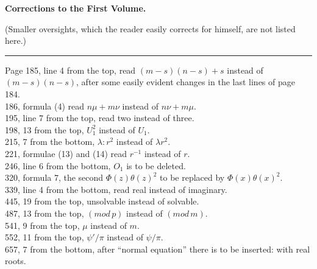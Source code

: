 
\begin{center}
\textbf{Corrections to the First Volume.}
\end{center}

\noindent (Smaller oversights, which the reader easily corrects for himself, are not listed here.)

\begin{center}
\rule{3cm}{0.4pt}
\end{center}

\bigskip
\noindent Page 185, line 4 from the top, read $(m-s)(n-s)+s$ instead of $(m-s)(n-s)$, after
some easily evident changes in the last lines of
page 184.\\
\glqq{} 186, formula (4) read $n\mu + m\nu$ instead of $n\nu + m\mu$.\\
\glqq{} 195, line 7 from the top, read two instead of three.\\
\glqq{} 198, \glqq{} 13 from the top, \glqq{} $U_1^2$ instead of $U_1$.\\
\glqq{} 215, \glqq{} 7 from the bottom, \glqq{} $\lambda : r^2$ instead of $\lambda r^2$.\\
\glqq{} 221, formulae (13) and (14) read $r^{-1}$ instead of $r$.\\
\glqq{} 246, line 6 from the bottom, $O_1$ is to be deleted.\\
\glqq{} 320, formula 7, the second $\Phi(z)\theta(z)^2$ to be replaced by $\Phi(x)\theta(x)^2$.\\
\glqq{} 339, line 4 from the bottom, read real instead of imaginary.\\
\glqq{} 445, \glqq{} 19 from the top, \glqq{} unsolvable instead of solvable.\\
\glqq{} 487, \glqq{} 13 from the top, \glqq{} $(\mathit{mod}\,p)$ instead of $(\mathit{mod}\,m)$.\\
\glqq{} 541, \glqq{} 9 from the top, \glqq{} $\mu$ instead of $m$.\\
\glqq{} 552, \glqq{} 11 from the top, \glqq{} $\psi'/\pi$ instead of $\psi/\pi$.\\
\glqq{} 657, \glqq{} 7 from the bottom, after ``normal equation'' there is to be inserted: with
real roots.

